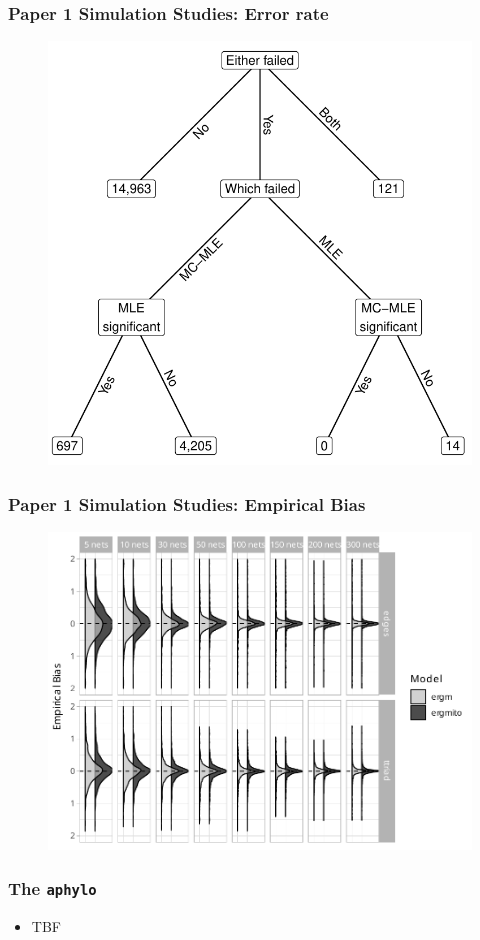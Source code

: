 \documentclass[aspectratio=169, 10pt]{beamer}\usepackage[]{graphicx}\usepackage[]{color}
\newcommand{\aphylopkg}[0]{\texttt{aphylo}}
\begin{document}
\begin{frame}[label=ergmsims,allowframebreaks]
\frametitle{Paper 1 Simulation Studies: Error rate}

\begin{figure}
\centering
\includegraphics[width=.4\linewidth]{failed-tree.pdf}
\end{figure}

\hyperlink{ergmitoexperiment}{}

\end{frame}

\begin{frame}
\frametitle{Paper 1 Simulation Studies: Empirical Bias}

\begin{figure}
\centering
\includegraphics[width=.6\linewidth]{bias-02-various-sizes-4-5-ttriad.pdf}
\end{figure}

\hyperlink{ergmitoexperiment}{}

\end{frame}

\begin{frame}[label=aphylopkg]
\frametitle{The \aphylopkg{}}

\begin{itemize}
\item TBF
\end{itemize}

\hyperlink{aphylo}{}
\end{frame}
\end{document}

